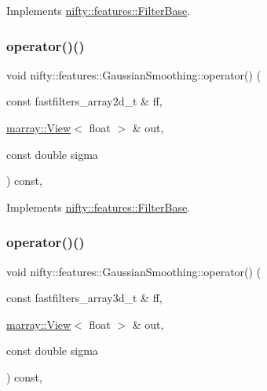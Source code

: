 Implements \hyperlink{structnifty_1_1features_1_1FilterBase_a1c278e2b6ef0cb2a5bba2f758c6855e2}{nifty\+::features\+::\+Filter\+Base}.

\mbox{\label{structnifty_1_1features_1_1GaussianSmoothing_a1b6bf85baa31180bad4070cc704b8723}} 
\subsubsection{\texorpdfstring{operator()()}{operator()()}\hspace{0.1cm}{\footnotesize\ttfamily [1/2]}}
{\footnotesize\ttfamily void nifty\+::features\+::\+Gaussian\+Smoothing\+::operator() (\begin{DoxyParamCaption}\item[{const fastfilters\+\_\+array2d\+\_\+t \&}]{ff,  }\item[{\hyperlink{classandres_1_1View}{marray\+::\+View}$<$ float $>$ \&}]{out,  }\item[{const double}]{sigma }\end{DoxyParamCaption}) const\hspace{0.3cm}{\ttfamily [inline]}, {\ttfamily [virtual]}}



Implements \hyperlink{structnifty_1_1features_1_1FilterBase_a17c77d36dd765c5ec0b163102428656c}{nifty\+::features\+::\+Filter\+Base}.

\mbox{\label{structnifty_1_1features_1_1GaussianSmoothing_a8daf036e19adc709e3790566861efb86}} 
\subsubsection{\texorpdfstring{operator()()}{operator()()}\hspace{0.1cm}{\footnotesize\ttfamily [2/2]}}
{\footnotesize\ttfamily void nifty\+::features\+::\+Gaussian\+Smoothing\+::operator() (\begin{DoxyParamCaption}\item[{const fastfilters\+\_\+array3d\+\_\+t \&}]{ff,  }\item[{\hyperlink{classandres_1_1View}{marray\+::\+View}$<$ float $>$ \&}]{out,  }\item[{const double}]{sigma }\end{DoxyParamCaption}) const\hspace{0.3cm}{\ttfamily [inline]}, {\ttfamily [virtual]}}



